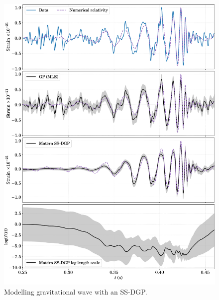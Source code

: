 \documentclass[seriffont, cmap=Beijing, 10pt]{zz}
\begin{document}
\begin{frame}{}
	\begin{figure}
		\centering
		\begin{minipage}[c]{.62\linewidth}
			\includegraphics[width=\linewidth]{../thesis_latex/figs/gravit-wave-ssdgp}
		\end{minipage}
		\begin{minipage}[c]{.37\linewidth}
			\caption{Modelling gravitational wave with an SS-DGP.}
		\end{minipage}
	\end{figure}
\end{frame}
\end{document}
